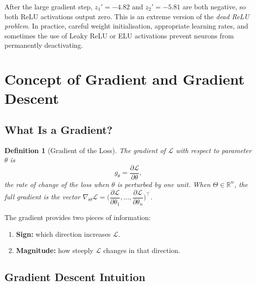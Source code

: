 \documentclass[12pt,a4paper]{article}
\newtheorem{definition}{Definition}[section]
\newcommand{\Loss}{\mathcal{L}}
\newcommand{\pderiv}[2]{\dfrac{\partial #1}{\partial #2}}
\begin{document}
\begin{keyinsight}[title=Dead ReLU Warning]
After the large gradient step, $z_1' = -4.82$ and $z_2' = -5.81$ are both
negative, so both ReLU activations output zero.
This is an extreme version of the \emph{dead ReLU problem}.
In practice, careful weight initialisation, appropriate learning rates, and
sometimes the use of Leaky ReLU or ELU activations prevent neurons from
permanently deactivating.
\end{keyinsight}

\section{Concept of Gradient and Gradient Descent}
\label{sec:gradient}

\subsection{What Is a Gradient?}

\begin{definition}[Gradient of the Loss]
\label{def:gradient}
The \emph{gradient} of $\Loss$ with respect to parameter $\theta$ is
\begin{equation}
  g_\theta = \pderiv{\Loss}{\theta},
  \label{eq:gradient-def}
\end{equation}
the rate of change of the loss when $\theta$ is perturbed by one unit.
When $\Theta \in \mathbb{R}^n$, the full gradient is the vector
$\nabla_\Theta \Loss = \bigl(\pderiv{\Loss}{\theta_1}, \ldots, \pderiv{\Loss}{\theta_n}\bigr)^\top$.
\end{definition}

The gradient provides two pieces of information:
\begin{enumerate}[leftmargin=2em]
  \item \textbf{Sign:} which direction increases $\Loss$.
  \item \textbf{Magnitude:} how steeply $\Loss$ changes in that direction.
\end{enumerate}

\subsection{Gradient Descent Intuition}
\end{document}
